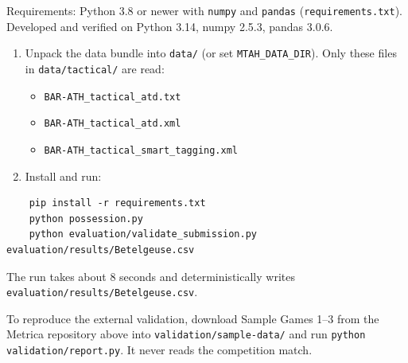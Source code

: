 \documentclass[11pt,a4paper]{article}
\newcommand{\code}[1]{\texttt{#1}}
\begin{document}
Requirements: Python 3.8 or newer with \code{numpy} and \code{pandas} (\code{requirements.txt}).
Developed and verified on Python 3.14, numpy 2.5.3, pandas 3.0.6.

\begin{enumerate}
  \item Unpack the data bundle into \code{data/} (or set \code{MTAH\_DATA\_DIR}). Only these files
        in \code{data/tactical/} are read:
        \begin{itemize}
          \item \code{BAR-ATH\_tactical\_atd.txt}
          \item \code{BAR-ATH\_tactical\_atd.xml}
          \item \code{BAR-ATH\_tactical\_smart\_tagging.xml}
        \end{itemize}
  \item Install and run:
\end{enumerate}

\begin{verbatim}
    pip install -r requirements.txt
    python possession.py
    python evaluation/validate_submission.py evaluation/results/Betelgeuse.csv
\end{verbatim}

The run takes about $8$ seconds and deterministically writes \code{evaluation/results/Betelgeuse.csv}.

To reproduce the external validation, download Sample Games 1--3 from the Metrica repository above
into \code{validation/sample-data/} and run \code{python validation/report.py}. It never reads the
competition match.
\end{document}
